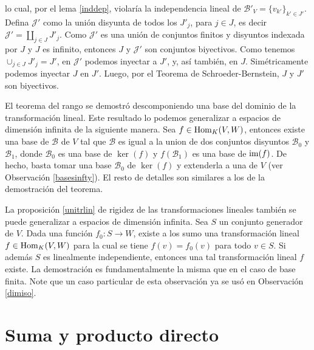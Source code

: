 \begin{obs}
lo cual, por el lema \ref{inddep}, violar\'ia la independencia lineal de $\mathcal{B}'_V=\{v_{k'}\}_{k'\in J'}$. Defina $\mathcal{J}'$ como la uni\'on disyunta de todos los $J'_j$, para $j\in J$, es decir $\mathcal{J}'=\coprod_{j\in J} J'_j$.
Como $\mathcal{J}'$ es una uni\'on de conjuntos finitos y disyuntos indexada por $J$ y $J$ es infinito, entonces $J$ y $\mathcal{J}'$ son conjuntos biyectivos. Como tenemos $\cup_{j\in J}J'_j=J'$, en $\mathcal{J}'$ podemos inyectar a $J'$, y, as\'i tambi\'en, en $J$. Sim\'etricamente podemos inyectar $J$ en $J'$. Luego, por el Teorema de Schroeder-Bernstein, $J$ y $J'$ son biyectivos.
\end{obs}

\begin{obs}
El teorema del rango se demostr\'o descomponiendo una base del dominio de la transformaci\'on lineal. Este resultado lo podemos generalizar a espacios de dimensi\'on infinita de la siguiente manera. Sea $f\in\operatorname{Hom}_K(V,W)$, entonces existe una base de $\mathcal{B}$ de $V$ tal que $\mathcal{B}$ es igual a la union de dos conjuntos disyuntos $\mathcal{B}_0$ y $ \mathcal{B}_1$, donde $\mathcal{B}_0$ es una base de $\ker(f)$ y $f\left(\mathcal{B}_1\right)$ es una base de $\operatorname{im}(f)$. De hecho, basta tomar una base $\mathcal{B}_0$ de $\ker(f)$ y extenderla a una de $V$ (ver Observaci\'on \ref{basesinfty}). El resto de detalles son similares a los de la demostraci\'on del teorema.
\end{obs}

\begin{obs}\label{unitrlinealinfty}
La proposici\'on \ref{unitrlin} de rigidez de las transformaciones lineales tambi\'en se puede generalizar a espacios de dimensi\'on infinita. Sea $S$ un conjunto generador de $V$. Dada una funci\'on $f_0: S\rightarrow W$, existe a los sumo una transformaci\'on lineal $f\in\operatorname{Hom}_K(V,W)$ para la cual se tiene $f(v)=f_0(v)$ para todo $v\in S$. Si adem\'as $S$ es linealmente independiente, entonces una tal transformaci\'on lineal $f$ existe. La demostraci\'on es fundamentalmente la misma que en el caso de base finita. Note que un caso particular de esta observaci\'on ya se us\'o en Observaci\'on \ref{dimiso}.
\end{obs}

\section{Suma y producto directo}

